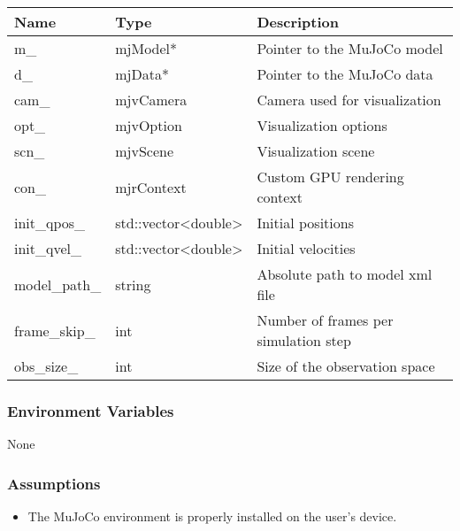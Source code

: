 \documentclass[12pt, titlepage]{article}
\begin{document}
\begin{center}
  \begin{tabular}{p{4cm} p{4cm} p{4cm}}
    \hline
    \textbf{Name} & \textbf{Type} & \textbf{Description} \\
    \hline
    m\_ & mjModel* & Pointer to the MuJoCo model\\
    \hline
    d\_ & mjData* & Pointer to the MuJoCo data\\
    \hline
    cam\_ & mjvCamera & Camera used for visualization\\
    \hline
    opt\_ & mjvOption & Visualization options\\
    \hline
    scn\_ & mjvScene & Visualization scene\\
    \hline
    con\_ & mjrContext & Custom GPU rendering context\\
    \hline
    init\_qpos\_ & std::vector\textless double\textgreater & Initial positions\\
    \hline
    init\_qvel\_ & std::vector\textless double\textgreater & Initial velocities\\
    \hline
    model\_path\_ & string & Absolute path to model xml file\\
    \hline
    frame\_skip\_ & int & Number of frames per simulation step\\
    \hline
    obs\_size\_ & int & Size of the observation space\\
    \hline
  \end{tabular}
\end{center}

\subsubsection{Environment Variables}
None

\subsubsection{Assumptions}
\begin{itemize}
  \item The MuJoCo environment is properly installed on the user's device.
\end{itemize}
\end{document}
